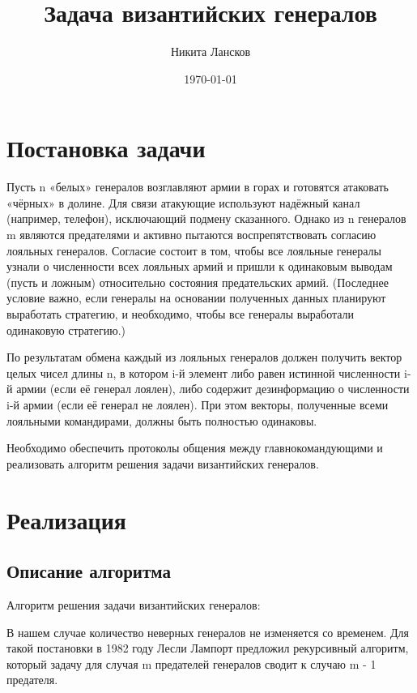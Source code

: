 \documentclass[a4paper,12pt]{article}
\author{Никита Лансков}
\title{Задача византийских генералов}
\date{\today}
\begin{document}

\maketitle
\tableofcontents

\newpage

\section{Постановка задачи}

Пусть n «белых» генералов возглавляют армии в горах и готовятся атаковать
«чёрных» в долине. Для связи атакующие используют надёжный канал (например,
телефон), исключающий подмену сказанного. Однако из n генералов m являются
предателями и активно пытаются воспрепятствовать согласию лояльных генералов.
Согласие состоит в том, чтобы все лояльные генералы узнали о численности всех лояльных
армий и пришли к одинаковым выводам (пусть и ложным) относительно состояния
предательских армий. (Последнее условие важно, если генералы на основании полученных
данных планируют выработать стратегию, и необходимо, чтобы все генералы выработали
одинаковую стратегию.)

По результатам обмена каждый из лояльных генералов должен получить вектор
целых чисел длины n, в котором i-й элемент либо равен истинной численности i-й армии
(если её генерал лоялен), либо содержит дезинформацию о численности i-й армии (если её
генерал не лоялен). При этом векторы, полученные всеми лояльными командирами,
должны быть полностью одинаковы.

Необходимо обеспечить протоколы общения между главнокомандующими и
реализовать алгоритм решения задачи византийских генералов.

\section{Реализация}

\subsection{Описание алгоритма}

Алгоритм решения задачи византийских генералов:

В нашем случае количество неверных генералов не изменяется со временем. Для
такой постановки в 1982 году Лесли Лампорт предложил рекурсивный алгоритм, который
задачу для случая m предателей генералов сводит к случаю m - 1 предателя.
\end{document}
